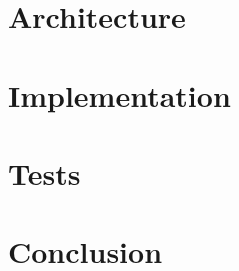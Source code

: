 \documentclass[a4paper, 11pt]{memoir}
\begin{document}
\chapter{Architecture}

\chapter{Implementation}

\chapter{Tests}

\chapter*{Conclusion}


\backmatter




\listoffigures
\end{document}
